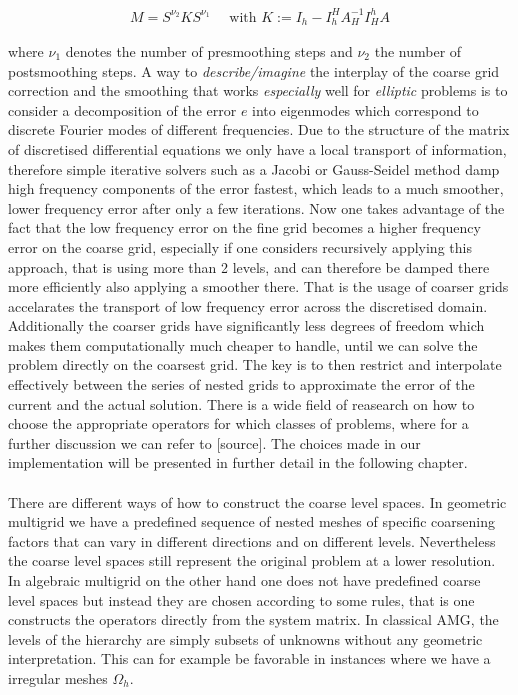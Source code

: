 \documentclass[../draft_1.tex]{subfiles}
\begin{document}
\begin{ceqn}
	\begin{align}
\label{two_level_iteration_operator}
M = S^{\nu_2} K S^{\nu_1} \quad \text{ with } K := I_h - I_h^H A_H^{-1} I_H^h A
	\end{align}
\end{ceqn}
where $\nu_1$ denotes the number of presmoothing steps and $\nu_2$ the number of postsmoothing steps. A way to \textit{describe/imagine} the interplay of the coarse grid correction and the smoothing that works \textit{especially} well for \textit{elliptic} problems is to consider a decomposition of the error $e$ into eigenmodes which correspond to discrete Fourier modes of different frequencies. Due to the structure of the matrix of discretised differential equations we only have a local transport of information, therefore simple iterative solvers such as a Jacobi or Gauss-Seidel method damp high frequency components of the error fastest, which leads to a much smoother, lower frequency error after only a few iterations. Now one takes advantage of the fact that the low frequency error on the fine grid becomes a higher frequency error on the coarse grid, especially if one considers recursively applying this approach, that is using more than 2 levels, and can therefore be damped there more efficiently also applying a smoother there. That is the usage of coarser grids accelarates the transport of low frequency error across the discretised domain. Additionally the coarser grids have significantly less degrees of freedom which makes them computationally much cheaper to handle, until we can solve the problem directly on the coarsest grid. The key is to then restrict and interpolate effectively between the series of nested grids to approximate the error of the current and the actual solution. There is a wide field of reasearch on how to choose the appropriate operators for which classes of problems, where for a further discussion we can refer to [source]. The choices made in our implementation will be presented in further detail in the following chapter. 
\smallskip
\\
\smallskip
\\
There are different ways of how to construct the coarse level spaces. In geometric multigrid we have a predefined sequence of nested meshes of specific coarsening factors that can vary in different directions and on different levels. Nevertheless the coarse level spaces still represent the original problem at a lower resolution. In algebraic multigrid on the other hand one does not have predefined coarse level spaces but instead they are chosen according to some rules, that is one constructs the operators directly from the system matrix. In classical AMG, the levels of the hierarchy are simply subsets of unknowns without any geometric interpretation. This can for example be favorable in instances where we have a irregular meshes $\Omega_h$. %
\end{document}
